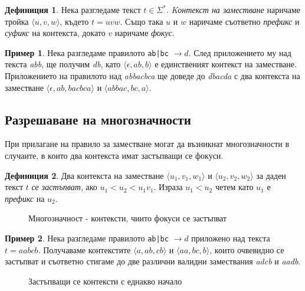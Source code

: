 \documentclass[12pt, oneside]{article}
\theoremstyle{definition}
\newtheorem{definition}{Дефиниция}[section]
\newtheorem{example}{Пример}[section]
\begin{document}
\begin{definition}
	Нека разгледаме текст \( t \in \Sigma^* \). \emph{Kонтекст на заместване} наричаме тройка \( \langle u,v,w \rangle \), където \( t = uvw \). Също така \( u \) и \( w \) наричаме съответно \emph{префикс} и \emph{суфикс} на контекста, докато \( v \) наричаме \emph{фокус}.
\end{definition}

\begin{example}
	Нека разгледаме правилото \verb/ab|bc/ \( \to d \). След приложението му над текста \emph{abb}, ще получим \emph{db}, като \( \langle \epsilon, ab, b \rangle \) е единственият контекст на заместване. Приложението на правилото над \emph{abbacbca} ще доведе до \emph{dbacda} с два контекста на заместване \( \langle \epsilon, ab, bacbca \rangle \) и \( \langle abbac, bc, a \rangle \).
\end{example}

\subsection{Разрешаване на многозначности}

При прилагане на правило за заместване могат да възникнат многозначности в случаите, в които два контекста имат застъпващи се фокуси.

\begin{definition}
	Два контекста на заместване \( \langle u_1,v_1,w_1 \rangle \) и \( \langle u_2,v_2,w_2 \rangle \) за даден текст \( t \) \emph{се застъпват}, ако \( u_1 < u_2 < u_1v_1 \). Израза \( u_1 < u_2 \) четем като \( u_1 \) е \emph{префикс} на \( u_2 \).
\end{definition}

\begin{figure}[!htb]
	\centering
	
	\caption{Многозначност - контексти, чиито фокуси се застъпват}
\end{figure}

\begin{example}
	Нека разгледаме правилото \verb/ab|bc/ \( \to d \) приложено над текста \( t = aabcb \). Получаваме контекстите \( \langle a, ab, cb \rangle \) и \( \langle aa, bc, b \rangle \), които очвевидно се застъпват и съответно стигаме до две различни валидни замествания \emph{adcb} и \emph{aadb}.
\end{example}

\begin{figure}[!htb]
	\centering
	
	\caption{Застъпващи се контексти с еднакво начало}
\end{figure}
\end{document}
